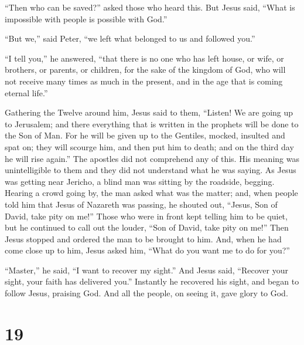  ``Then who can be saved?'' asked those who heard this.
 But Jesus said, ``What is impossible with people is
possible with God.''

 ``But we,'' said Peter, ``we left what belonged to us and
followed you.''

 ``I tell you,'' he answered, ``that there is no one who
has left house, or wife, or brothers, or parents, or children, for the
sake of the kingdom of God,  who will not receive many
times as much in the present, and in the age that is coming eternal
life.''

 Gathering the Twelve around him, Jesus said to them,
``Listen! We are going up to Jerusalem; and there everything that is
written in the prophets will be done to the Son of Man. 
For he will be given up to the Gentiles, mocked, insulted and spat on;
 they will scourge him, and then put him to death; and on
the third day he will rise again.''  The apostles did not
comprehend any of this. His meaning was unintelligible to them and they
did not understand what he was saying.  As Jesus was
getting near Jericho, a blind man was sitting by the roadside, begging.
 Hearing a crowd going by, the man asked what was the
matter;  and, when people told him that Jesus of Nazareth
was passing,  he shouted out, ``Jesus, Son of David, take
pity on me!''  Those who were in front kept telling him to
be quiet, but he continued to call out the louder, ``Son of David, take
pity on me!''  Then Jesus stopped and ordered the man to be
brought to him. And, when he had come close up to him, Jesus asked him,
 ``What do you want me to do for you?''

``Master,'' he said, ``I want to recover my sight.''  And
Jesus said, ``Recover your sight, your faith has delivered you.''
 Instantly he recovered his sight, and began to follow
Jesus, praising God. And all the people, on seeing it, gave glory to
God.

\hypertarget{section-17}{%
\section{19}\label{section-17}}

